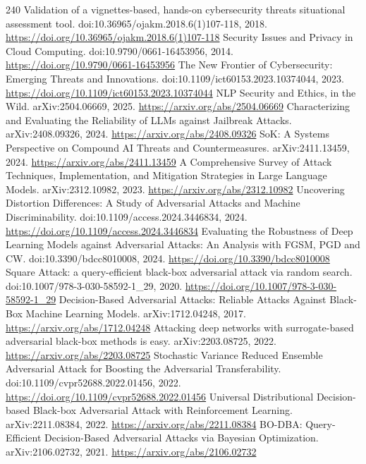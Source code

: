 \documentclass[11pt]{article}
\begin{document}
\begin{thebibliography}{240}
 Validation of a vignettes-based, hands-on cybersecurity threats situational assessment tool. doi:10.36965/ojakm.2018.6(1)107-118, 2018. \url{https://doi.org/10.36965/ojakm.2018.6(1)107-118}
 Security Issues and Privacy in Cloud Computing. doi:10.9790/0661-16453956, 2014. \url{https://doi.org/10.9790/0661-16453956}
 The New Frontier of Cybersecurity: Emerging Threats and Innovations. doi:10.1109/ict60153.2023.10374044, 2023. \url{https://doi.org/10.1109/ict60153.2023.10374044}
 NLP Security and Ethics, in the Wild. arXiv:2504.06669, 2025. \url{https://arxiv.org/abs/2504.06669}
 Characterizing and Evaluating the Reliability of LLMs against Jailbreak Attacks. arXiv:2408.09326, 2024. \url{https://arxiv.org/abs/2408.09326}
 SoK: A Systems Perspective on Compound AI Threats and Countermeasures. arXiv:2411.13459, 2024. \url{https://arxiv.org/abs/2411.13459}
 A Comprehensive Survey of Attack Techniques, Implementation, and Mitigation Strategies in Large Language Models. arXiv:2312.10982, 2023. \url{https://arxiv.org/abs/2312.10982}
 Uncovering Distortion Differences: A Study of Adversarial Attacks and Machine Discriminability. doi:10.1109/access.2024.3446834, 2024. \url{https://doi.org/10.1109/access.2024.3446834}
 Evaluating the Robustness of Deep Learning Models against Adversarial Attacks: An Analysis with FGSM, PGD and CW. doi:10.3390/bdcc8010008, 2024. \url{https://doi.org/10.3390/bdcc8010008}
 Square Attack: a query-efficient black-box adversarial attack via random search. doi:10.1007/978-3-030-58592-1\_29, 2020. \url{https://doi.org/10.1007/978-3-030-58592-1_29}
 Decision-Based Adversarial Attacks: Reliable Attacks Against Black-Box Machine Learning Models. arXiv:1712.04248, 2017. \url{https://arxiv.org/abs/1712.04248}
 Attacking deep networks with surrogate-based adversarial black-box methods is easy. arXiv:2203.08725, 2022. \url{https://arxiv.org/abs/2203.08725}
 Stochastic Variance Reduced Ensemble Adversarial Attack for Boosting the Adversarial Transferability. doi:10.1109/cvpr52688.2022.01456, 2022. \url{https://doi.org/10.1109/cvpr52688.2022.01456}
 Universal Distributional Decision-based Black-box Adversarial Attack with Reinforcement Learning. arXiv:2211.08384, 2022. \url{https://arxiv.org/abs/2211.08384}
 BO-DBA: Query-Efficient Decision-Based Adversarial Attacks via Bayesian Optimization. arXiv:2106.02732, 2021. \url{https://arxiv.org/abs/2106.02732}

\end{thebibliography}
\end{document}
